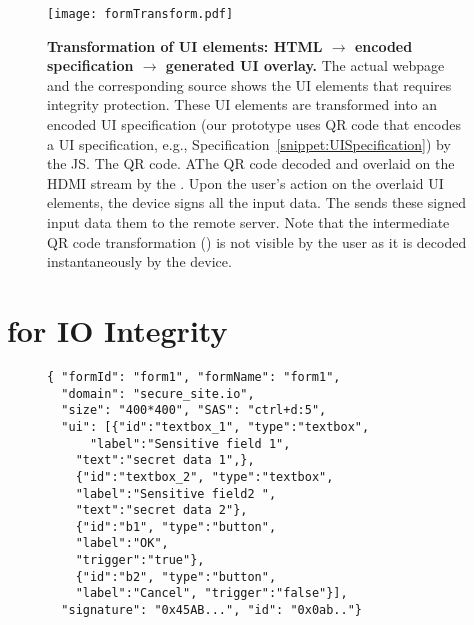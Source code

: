 \begin{figure*}[t]
\centering
\texttt{[image: formTransform.pdf]}
\caption{\textbf{Transformation of UI elements: HTML $\rightarrow$ encoded specification $\rightarrow$ \device generated UI overlay.} \one The actual webpage and the corresponding \html source shows the UI elements that requires integrity protection. \two These UI elements are transformed into an encoded UI specification (our \name prototype uses QR code that encodes a UI specification, e.g., Specification~\ref{snippet:UISpecification}) by the \name JS. The QR code. \three AThe QR code decoded and overlaid on the HDMI stream by the \device. \four Upon the user's action on the overlaid UI elements, the device signs all the input data. \five The \device sends these signed input data them to the remote server. Note that the intermediate QR code transformation (\two) is not visible by the user as it is decoded instantaneously by the device.}
\spacesave
\label{fig:transformation}
\end{figure*}

\section{\name for IO Integrity}
\label{sec:systemDesign}




\begin{figure}[t]
\begin{lstlisting}[mathescape=true]
{ "formId": "form1", "formName": "form1",
  "domain": "secure_site.io",
  "size": "400*400", "SAS": "ctrl+d:5",
  "ui": [{"id":"textbox_1", "type":"textbox", 
      "label":"Sensitive field 1",
    "text":"secret data 1",},
    {"id":"textbox_2", "type":"textbox",
    "label":"Sensitive field2 ",
    "text":"secret data 2"},
    {"id":"b1", "type":"button",
    "label":"OK",
    "trigger":"true"},    
    {"id":"b2", "type":"button",
    "label":"Cancel", "trigger":"false"}],
  "signature": "0x45AB...", "id": "0x0ab.."}
\end{lstlisting}
\end{figure}

